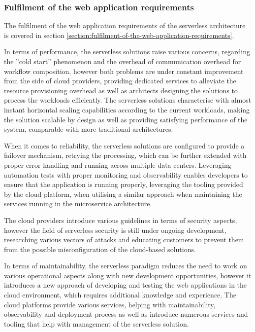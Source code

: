 \subsubsection{Fulfilment of the web application requirements}

The fulfilment of the web application requirements of the serverless architecture is covered in section \ref{section:fulfilment-of-the-web-application-requirements}.

In terms of performance, the serverless solutions raise various concerns, regarding the ''cold start'' phenomenon and the overhead of communication overhead for workflow composition, however both problems are under constant improvement from the side of cloud providers, providing dedicated services to alleviate the resource provisioning overhead as well as architects designing the solutions to process the workloads efficiently.
The serverless solutions characterise with almost instant horizontal scaling capabilities according to the current workloads, making the solution scalable by design as well as providing satisfying performance of the system, comparable with more traditional architectures.

When it comes to reliability, the serverless solutions are configured to provide a failover mechanism, retrying the processing, which can be further extended with proper error handling and running across multiple data centers.
Leveraging automation tests with proper monitoring and observability enables developers to ensure that the application is running properly, leveraging the tooling provided by the cloud platform, when utilising a similar approach when maintaining the services running in the microservice architecture.

The cloud providers introduce various guidelines in terms of security aspects, however the field of serverless security is still under ongoing development, researching various vectors of attacks and educating customers to prevent them from the possible misconfiguration of the cloud-based solutions.

In terms of maintainability, the serverless paradigm reduces the need to work on various operational aspects along with new development opportunities, however it introduces a new approach of developing and testing the web applications in the cloud environment, which requires additional knowledge and experience.
The cloud platforms provide various services, helping with maintainability, observability and deployment process as well as introduce numerous services and tooling that help with management of the serverless solution. \\

